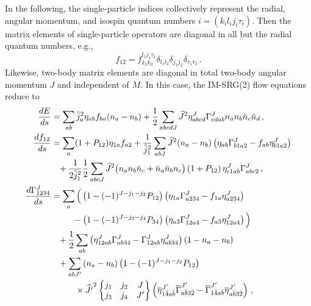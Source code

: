 In the following, the single-particle indices collectively represent the radial, angular momentum, and isospin quantum numbers $i=(k_{i}l_{i}j_{i}\tau_{i})$. Then the matrix elements of single-particle operators are diagonal in all but the radial quantum numbers, e.g.,
\begin{equation}
  f_{12}=f^{l_{1}j_{1}\tau_{1}}_{k_{1}k_{2}}\delta_{l_{1}l_{2}}\delta_{j_{1}j_{2}}\delta_{\tau_{1}\tau_{2}}\,.
\end{equation}
Likewise, two-body matrix elements are diagonal in total two-body angular momentum $J$ and independent of $M$. In this case, the IM-SRG(2) flow equations reduce to
\begin{align}
  \label{eq:imsrg2_j0b}
  \totd{E}{s}&=\sum_{ab}\hat{j}_{a}^{2}\eta_{ab}f_{ba}(n_{a}-n_{b})
          +\frac{1}{2}\sum_{abcdJ}\hJ^{2}\eta^{J}_{abcd}\Gamma^{J}_{cdab}n_{a}n_{b}\nn_{c}\nn_{d}\,,\\
%
  \label{eq:imsrg2_j1b}
  \totd{f_{12}}{s}&=\sum_{a}(1+P_{12})\eta_{1a}f_{a2}
            +\frac{1}{\hat{j}^{2}_{1}}\sum_{abJ}\hJ^{2}(n_{a}-n_{b})\left(\eta_{ab}\Gamma^{J}_{b1a2}-f_{ab}\eta^{J}_{b1a2}\right)\notag\\                 
           &\hphantom{=}+\frac{1}{2\hat{j}^{2}_{1}}
          \frac{1}{2}\sum_{abcJ}\hJ^{2}\big(n_{a}n_{b}\nn_{c}+\nn_{a}\nn_{b}n_{c}\big)
            \left(1+P_{12}\right)\eta^{J}_{c1ab}\Gamma^{J}_{abc2}
          \,,\\                 
%
  \label{eq:imsrg2_j2b}
 \totd{\Gamma^{J}_{1234}}{s}
        &=\sum_{a}\Big(\left(1-(-1)^{J-j_{1}-j_{2}}P_{12}\right)
                       \left(\eta_{1a}\Gamma^{J}_{a234}-f_{1a}\eta^{J}_{a234}\right)\notag\\
        &\hphantom{=\sum_a}- \left(1-(-1)^{J-j_{3}-j_{4}}P_{34}\right)
                    \left(\eta_{a3}\Gamma^{J}_{12a4}-f_{a3}\eta^{J}_{12a4}\right)\Big)\notag\\
        &\hphantom{=}+\frac{1}{2}\sum_{ab}\left(\eta^{J}_{12ab}\Gamma^{J}_{ab34}-\Gamma^{J}_{12ab}\eta^{J}_{ab34}\right)\left(1-n_{a}-n_{b}\right)\notag\\
        &\hphantom{=}+\sum_{abJ'}\left(n_{a}-n_{b}\right)\left(1-(-1)^{J-j_{1}-j_{2}}P_{12}\right)\notag\\
        &\hphantom{=}\qquad\times
          \widehat{J'}^2\sixj{j_{1} & j_{2} & J \\ j_{3} & j_{4} & J'}\left(\overline\eta^{J'}_{1\bar{4}a\bar{b}}\overline\Gamma^{J'}_{a\bar{b}3\bar{2}}-\overline\Gamma^{J'}_{1\bar{4}a\bar{b}}\overline\eta^{J'}_{a\bar{b}3\bar{2}}\right)\,,
\end{align}
